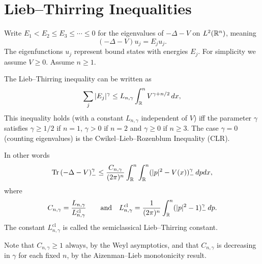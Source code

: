 \documentclass[12pt,letterpaper, reqno]{amsart}
\begin{document}
\section{Lieb--Thirring Inequalities}

 Write $E_1 < E_2 \leq
E_3 \leq \cdots \leq 0$ for the eigenvalues of $-\Delta - V$ on
$L^2(\mathbb R^n)$, meaning
\[
(-\Delta - V)u_j = E_j u_j .
\]
The eigenfunctions $u_j$ represent bound states with energies $E_j$.
For simplicity we assume $\boxed{V \geq 0}$. Assume $n \geq 1$.

The Lieb--Thirring inequality can be written as
\[
\sum_j |E_j|^\gamma \leq L_{n,\gamma} \int_\mathbb R^n V^{\gamma + n/2} \,
dx ,
\]
This inequality holds (with a constant $L_{n,\gamma}$ independent of $V$) iff the parameter $\gamma$ satisfies $\gamma\geq 1/2$ if $n=1$, $\gamma>0$ if $n=2$ and $\gamma\geq 0$ if $n\geq 3$. The case $\gamma = 0$ (counting eigenvalues)
is the Cwikel--Lieb--Rozenblum Inequality (CLR).

In other words
\[
\text{Tr} \left( -\Delta - V \right)_-^\gamma \leq
\frac{C_{n,\gamma}}{(2\pi)^n} \int_\mathbb R^n \int_\mathbb R^n (|p|^2 -
V(x))_-^\gamma \, dp dx ,
\]
where
\[
C_{n,\gamma} = \frac{L_{n,\gamma}}{L^{\text{cl}}_{n,\gamma}} \qquad
\text{and} \quad L^{\text{cl}}_{n,\gamma} = \frac{1}{(2\pi)^n}
\int_\mathbb R^n (|p|^2-1)_-^\gamma \, dp .
\]
The constant $L^{\text{cl}}_{n,\gamma}$ is called the semiclassical
Lieb--Thirring constant.

Note that $C_{n,\gamma} \geq 1$ always, by the Weyl asymptotics, and
that $C_{n,\gamma}$ is decreasing in $\gamma$ for each fixed $n$, by
the Aizenman--Lieb monotonicity result.
\end{document}
